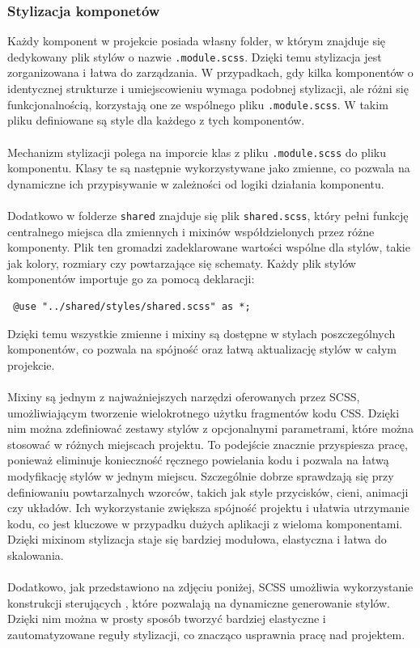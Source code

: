 \documentclass[12pt,a4paper]{article}
\begin{document}
\newpage

\subsubsection{Stylizacja komponetów}

\noindent
Każdy komponent w projekcie posiada własny folder, w którym znajduje się dedykowany plik stylów o nazwie \texttt{.module.scss}. Dzięki temu stylizacja jest zorganizowana i łatwa do zarządzania. W przypadkach, gdy kilka komponentów o identycznej strukturze i umiejscowieniu wymaga podobnej stylizacji, ale różni się funkcjonalnością, korzystają one ze wspólnego pliku \texttt{.module.scss}. W takim pliku definiowane są style dla każdego z tych komponentów.
\\\\
Mechanizm stylizacji polega na imporcie klas z pliku \texttt{.module.scss} do pliku komponentu. Klasy te są następnie wykorzystywane jako zmienne, co pozwala na dynamiczne ich przypisywanie w zależności od logiki działania komponentu.
\\\\
Dodatkowo w folderze \texttt{shared} znajduje się plik \texttt{shared.scss}, który pełni funkcję centralnego miejsca dla zmiennych i mixinów współdzielonych przez różne komponenty. Plik ten gromadzi zadeklarowane wartości wspólne dla stylów, takie jak kolory, rozmiary czy powtarzające się schematy. Każdy plik stylów komponentów importuje go za pomocą deklaracji:

\begin{verbatim} @use "../shared/styles/shared.scss" as *; \end{verbatim}

Dzięki temu wszystkie zmienne i mixiny są dostępne w stylach poszczególnych komponentów, co pozwala na spójność oraz łatwą aktualizację stylów w całym projekcie.
\\\\
Mixiny są jednym z najważniejszych narzędzi oferowanych przez SCSS, umożliwiającym tworzenie wielokrotnego użytku fragmentów kodu CSS. Dzięki nim można zdefiniować zestawy stylów z opcjonalnymi parametrami, które można stosować w różnych miejscach projektu. To podejście znacznie przyspiesza pracę, ponieważ eliminuje konieczność ręcznego powielania kodu i pozwala na łatwą modyfikację stylów w jednym miejscu. Szczególnie dobrze sprawdzają się przy definiowaniu powtarzalnych wzorców, takich jak style przycisków, cieni, animacji czy układów. Ich wykorzystanie zwiększa spójność projektu i ułatwia utrzymanie kodu, co jest kluczowe w przypadku dużych aplikacji z wieloma komponentami. Dzięki mixinom stylizacja staje się bardziej modułowa, elastyczna i łatwa do skalowania.
\\\\
Dodatkowo, jak przedstawiono na zdjęciu poniżej, SCSS umożliwia wykorzystanie konstrukcji sterujących , które pozwalają na dynamiczne generowanie stylów. Dzięki nim można w prosty sposób tworzyć bardziej elastyczne i zautomatyzowane reguły stylizacji, co znacząco usprawnia pracę nad projektem.
\end{document}
